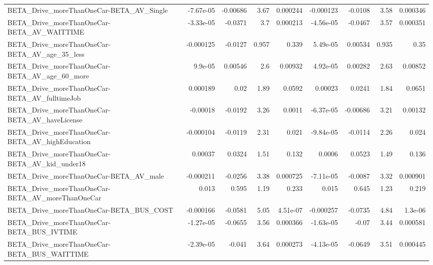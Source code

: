 \begin{tabular}{lrrrrrrrr}
BETA\_Drive\_moreThanOneCar-BETA\_AV\_Single           &   -7.67e-05 &     -0.00686 &      3.67 & 0.000244 &  -0.000123 &     -0.0108 &         3.58 &      0.000346 \\
BETA\_Drive\_moreThanOneCar-BETA\_AV\_WAITTIME         &   -3.33e-05 &      -0.0371 &       3.7 & 0.000213 &  -4.56e-05 &     -0.0467 &         3.57 &      0.000351 \\
BETA\_Drive\_moreThanOneCar-BETA\_AV\_age\_35\_less      &   -0.000125 &      -0.0127 &     0.957 &    0.339 &   5.49e-05 &     0.00534 &        0.935 &          0.35 \\
BETA\_Drive\_moreThanOneCar-BETA\_AV\_age\_60\_more      &     9.9e-05 &      0.00546 &       2.6 &  0.00932 &   4.92e-05 &     0.00282 &         2.63 &       0.00852 \\
BETA\_Drive\_moreThanOneCar-BETA\_AV\_fulltimeJob      &    0.000189 &         0.02 &      1.89 &   0.0592 &    0.00023 &      0.0241 &         1.84 &        0.0651 \\
BETA\_Drive\_moreThanOneCar-BETA\_AV\_haveLicense      &    -0.00018 &      -0.0192 &      3.26 &   0.0011 &  -6.37e-05 &    -0.00686 &         3.21 &       0.00132 \\
BETA\_Drive\_moreThanOneCar-BETA\_AV\_highEducation    &   -0.000104 &      -0.0119 &      2.31 &    0.021 &  -9.84e-05 &     -0.0114 &         2.26 &         0.024 \\
BETA\_Drive\_moreThanOneCar-BETA\_AV\_kid\_under18      &     0.00037 &       0.0324 &      1.51 &    0.132 &     0.0006 &      0.0523 &         1.49 &         0.136 \\
BETA\_Drive\_moreThanOneCar-BETA\_AV\_male             &   -0.000211 &      -0.0256 &      3.38 & 0.000725 &  -7.11e-05 &     -0.0087 &         3.32 &      0.000901 \\
BETA\_Drive\_moreThanOneCar-BETA\_AV\_moreThanOneCar   &       0.013 &        0.595 &      1.19 &    0.233 &      0.015 &       0.645 &         1.23 &         0.219 \\
BETA\_Drive\_moreThanOneCar-BETA\_BUS\_COST            &   -0.000166 &      -0.0581 &      5.05 & 4.51e-07 &  -0.000257 &     -0.0735 &         4.84 &       1.3e-06 \\
BETA\_Drive\_moreThanOneCar-BETA\_BUS\_IVTIME          &   -1.27e-05 &      -0.0655 &      3.56 & 0.000366 &  -1.63e-05 &       -0.07 &         3.44 &      0.000581 \\
BETA\_Drive\_moreThanOneCar-BETA\_BUS\_WAITTIME        &   -2.39e-05 &       -0.041 &      3.64 & 0.000273 &  -4.13e-05 &     -0.0649 &         3.51 &      0.000445 \\

\end{tabular}
